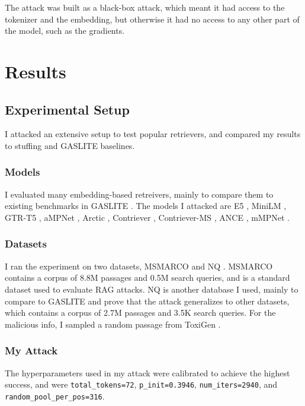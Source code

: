 \documentclass[a4paper, sigconf]{acmart}
\begin{document}
The attack was built as a black-box attack, which meant it had access to the tokenizer and the embedding, but otherwise it had no access to any other part of the model, such as the gradients.


\section{Results}

\subsection{Experimental Setup} \label{sec:expset}

I attacked an extensive setup to test popular retrievers, and compared my results to stuffing and GASLITE baselines.

\subsubsection*{Models} I evaluated many embedding-based retreivers, mainly to compare them to existing benchmarks in GASLITE \cite{bentov2024}. The models I attacked are E5 \cite{wang2024}, MiniLM \cite{wang2020}, GTR-T5 \cite{ni2021}, aMPNet \cite{song2020}, Arctic \cite{merrick2024}, Contriever \cite{izacard2022}, Contriever-MS \cite{izacard2022}, ANCE \cite{xiong2020}, mMPNet \cite{song2020}.

\subsubsection*{Datasets} I ran the experiment on two datasets, MSMARCO \cite{bajaj2018} and NQ \cite{kwiatkowski2019}. MSMARCO contains a corpus of 8.8M passages and 0.5M search queries, and is a standard dataset used to evaluate RAG attacks. NQ is another database I used, mainly to compare to GASLITE \cite{bentov2024} and prove that the attack generalizes to other datasets, which contains a corpus of 2.7M passages and 3.5K search queries. For the malicious info, I sampled a random passage from ToxiGen \cite{hartvigsen2022}.

\subsubsection*{My Attack} The hyperparameters used in my attack were calibrated to achieve the highest success, and were  \texttt{total\_tokens=72}, \texttt{p\_init=0.3946}, \texttt{num\_iters=2940}, and \texttt{random\_pool\_per\_pos=316}.
\end{document}
